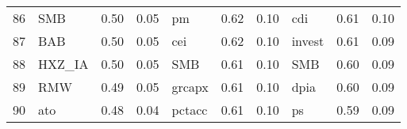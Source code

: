 \documentclass[12pt]{article}
\begin{document}
\begin{landscape}
\begin{footnotesize}
\begin{longtable}{l|lcc|lcc|lcc}
			86                    & SMB                         & 0.50                                                                                 & 0.05                            & pm                          & 0.62                                                                                 & 0.10                            & cdi                         & 0.61                                                                                 & 0.10                           \\
			87                    & BAB                         & 0.50                                                                                 & 0.05                            & cei                         & 0.62                                                                                 & 0.10                            & invest                      & 0.61                                                                                 & 0.09                           \\
			88                    & HXZ\_IA                     & 0.50                                                                                 & 0.05                            & SMB                         & 0.61                                                                                 & 0.10                            & SMB                         & 0.60                                                                                 & 0.09                           \\
			89                    & RMW                         & 0.49                                                                                 & 0.05                            & grcapx                      & 0.61                                                                                 & 0.10                            & dpia                        & 0.60                                                                                 & 0.09                           \\
			90                    & ato                         & 0.48                                                                                 & 0.04                            & pctacc                      & 0.61                                                                                 & 0.10                            & ps                          & 0.59                                                                                 & 0.09                           \\

\end{longtable}
\end{footnotesize}
\end{landscape}
\end{document}
